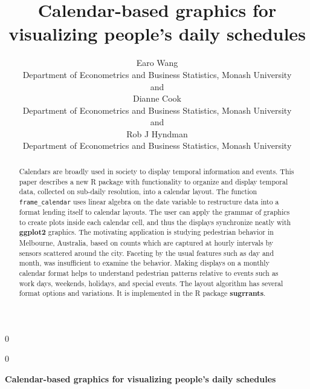 \documentclass[12pt]{article}
\newcommand{\blind}{0}
\begin{document}
\def\spacingset#1{\renewcommand{\baselinestretch}%
{#1}\small\normalsize} \spacingset{1}



\blind
{
  \title{\bf Calendar-based graphics for visualizing people's daily schedules}

  \author{
        Earo Wang \\
    Department of Econometrics and Business Statistics, Monash University\\
     and \\     Dianne Cook \\
    Department of Econometrics and Business Statistics, Monash University\\
     and \\     Rob J Hyndman \\
    Department of Econometrics and Business Statistics, Monash University\\
      }
  \maketitle
} \fi

\blind
{
  \bigskip
  \bigskip
  \bigskip
  \begin{center}
    {\LARGE\bf Calendar-based graphics for visualizing people's daily schedules}
  \end{center}
  \medskip
} \fi

\bigskip
\begin{abstract}
Calendars are broadly used in society to display temporal information
and events. This paper describes a new R package with functionality to
organize and display temporal data, collected on sub-daily resolution,
into a calendar layout. The function \texttt{frame\_calendar} uses
linear algebra on the date variable to restructure data into a format
lending itself to calendar layouts. The user can apply the grammar of
graphics to create plots inside each calendar cell, and thus the
displays synchronize neatly with \textbf{ggplot2} graphics. The
motivating application is studying pedestrian behavior in Melbourne,
Australia, based on counts which are captured at hourly intervals by
sensors scattered around the city. Faceting by the usual features such
as day and month, was insufficient to examine the behavior. Making
displays on a monthly calendar format helps to understand pedestrian
patterns relative to events such as work days, weekends, holidays, and
special events. The layout algorithm has several format options and
variations. It is implemented in the R package \textbf{sugrrants}.
\end{abstract}
\end{document}
